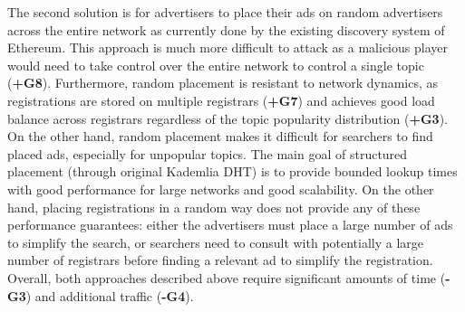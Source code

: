 The second solution is for  advertisers to place their ads on random advertisers across the entire network as currently done by the existing discovery system of Ethereum. This approach is much more difficult to attack as a malicious player would need to take control over the entire network to control a single topic (\textbf{+G8}). Furthermore, random placement is resistant to network dynamics, as registrations are stored on multiple registrars (\textbf{+G7}) and achieves good load balance across registrars regardless of the topic popularity distribution (\textbf{+G3}). On the other hand, random placement makes it difficult for searchers to find placed ads, especially for unpopular topics. The main goal of structured placement (through original Kademlia DHT) is to provide bounded lookup times with good performance for large networks and good scalability. On the other hand, placing registrations in a random way does not provide any of these performance guarantees: either the advertisers must place a large number of ads to simplify the search, or searchers need to consult with potentially a large number of registrars before finding a relevant ad to simplify the registration. Overall, both approaches described above require significant amounts of time (\textbf{-G3}) and additional traffic (\textbf{-G4}). 

